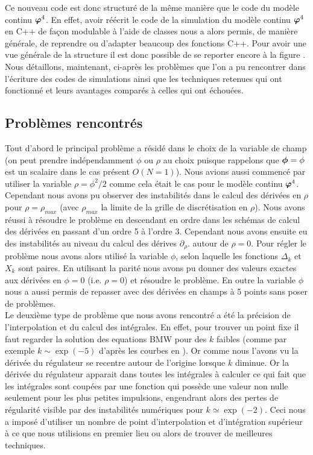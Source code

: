 \documentclass[10pt]{article}
\begin{document}
\begin{multicols}{2}
Ce nouveau code est donc structuré de la même manière que le code du modèle continu $\boldsymbol{ \varphi}^4$. En effet, avoir réécrit le code de la simulation du modèle continu $\boldsymbol{ \varphi}^4$ en C++ de façon modulable à l'aide de classes nous a alors permis, de manière générale, de reprendre ou d'adapter beaucoup des fonctions C++. Pour avoir une vue générale de la structure il est donc possible de se reporter encore à la figure . Nous détaillons, maintenant, ci-après les problèmes que l'on a pu rencontrer dans l'écriture des codes de simulations ainsi que les techniques retenues qui ont fonctionné et leurs avantages comparés à celles qui ont échouées. 





\subsection{Problèmes rencontrés}

Tout d'abord le principal problème a résidé dans le choix de la variable de champ (on peut prendre indépendamment $\phi$ ou $\rho$ au choix puisque rappelons que $\boldsymbol{ \phi}=\phi$ est un scalaire dans le cas présent $O(N=1)$). Nous avions aussi commencé par utiliser la variable $\rho = \phi^2/2$ comme cela était le cas pour le modèle continu $\boldsymbol{ \varphi}^4$. Cependant nous avons pu observer des instabilités dans le calcul des dérivées en $\rho$ pour $\rho = \rho_{max}$ (avec $\rho_{max}$ la limite de la grille de discrétisation en $\rho$). Nous avons réussi à résoudre le problème en descendant en ordre dans les schémas de calcul des dérivées en passant d'un ordre 5 à l'ordre 3. Cependant nous avons ensuite eu  des instabilités au niveau du calcul des dérives $\partial_{\rho} . $ autour de $\rho = 0$. Pour régler le problème nous avons alors utilisé la variable $\phi$, selon laquelle les fonctions $\Delta_k$ et $X_k$ sont paires. En utilisant la parité nous avons pu donner des valeurs exactes aux dérivées en $\phi = 0$ (i.e. $\rho = 0$) et résoudre le problème. En outre la variable $\phi$ nous a aussi permis de repasser avec des dérivées en champs à 5 points sans poser de problèmes. \\

Le deuxième type de problème que nous avons rencontré a été la précision de l'interpolation et du calcul des intégrales. En effet, pour trouver un point fixe il faut regarder la solution des equations BMW pour des $k$ faibles (comme par exemple $k \sim \exp(-5)$ d'après les courbes en ). Or comme nous l'avons vu la dérivée du régulateur se recentre autour de l'origine lorsque $k$ diminue. Or la dérivée du régulateur apparait dans toutes les intégrales à calculer ce qui fait que les intégrales sont coupées par une fonction qui possède une valeur non nulle seulement pour les plus petites impulsions, engendrant alors des pertes de régularité visible par des instabilités numériques pour $k \simeq \exp(-2)$. Ceci nous a imposé d'utiliser un nombre de point d'interpolation et d'intégration supérieur à ce que nous utilisions en premier lieu ou alors de trouver de meilleures techniques. \\


\end{multicols}
\end{document}
